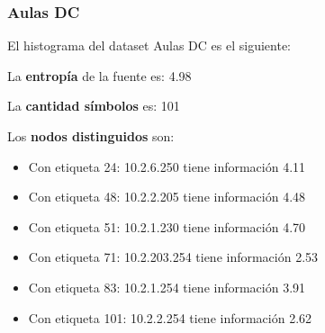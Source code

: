 \subsubsection{Aulas DC}

El histograma del dataset Aulas DC es el siguiente:

\begin{center}
\end{center}


La \textbf{entropía} de la fuente es: 4.98

La \textbf{cantidad símbolos} es: 101

Los \textbf{nodos distinguidos} son:

\begin{itemize}
    \item Con etiqueta 24: 10.2.6.250 tiene información 4.11
    \item Con etiqueta 48: 10.2.2.205 tiene información 4.48
    \item Con etiqueta 51: 10.2.1.230 tiene información 4.70
    \item Con etiqueta 71: 10.2.203.254 tiene información 2.53
    \item Con etiqueta 83: 10.2.1.254 tiene información 3.91
    \item Con etiqueta 101: 10.2.2.254 tiene información 2.62
\end{itemize}

